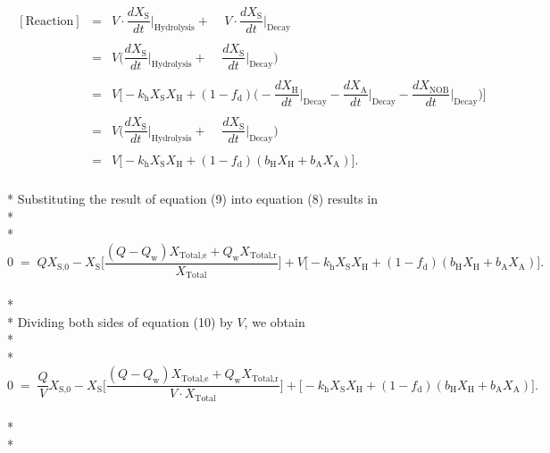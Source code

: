 \documentclass[]{article}
\begin{document}
\begin{align}
\begin{array}{rcl}
[\text{Reaction}] &=& V \cdot  \dfrac{dX_{\text{S}}}{dt}\biggr\rvert_{\text{Hydrolysis}} + \; \;  \; \; V \cdot \dfrac{dX_{\text{S}}}{dt}\biggr\rvert_{\text{Decay}} \\ \\
&=& V \Bigg(\dfrac{dX_{\text{S}}}{dt}\biggr\rvert_{\text{Hydrolysis}} + \; \;  \; \; \dfrac{dX_{\text{S}}}{dt}\biggr\rvert_{\text{Decay}}\Bigg) \\ \\
&=& V \Bigg[-k_{\text{h}}X_{\text{S}}X_{\text{H}} + (1-f_{\text{d}})\Bigg(-\dfrac{dX_{\text{H}}}{dt}\biggr\rvert_{\text{Decay}} - \dfrac{dX_{\text{A}}}{dt}\biggr\rvert_{\text{Decay}} - \dfrac{dX_{\text{NOB}}}{dt}\biggr\rvert_{\text{Decay}}\Bigg)\Bigg] \\ \\
&=& V \Bigg(\dfrac{dX_{\text{S}}}{dt}\biggr\rvert_{\text{Hydrolysis}} + \; \;  \; \; \dfrac{dX_{\text{S}}}{dt}\biggr\rvert_{\text{Decay}}\Bigg) \\ \\
&=& V \Big[-k_{\text{h}}X_{\text{S}}X_{\text{H}} + (1-f_{\text{d}})(b_{\text{H}}X_{\text{H}} + b_{\text{A}}X_{\text{A}})\Big].
\end{array}
\end{align} \\*
Substituting the result of equation (9) into equation (8) results in \\* \\* 
\begin{equation}
0 \; = \; QX_{\text{S,0}} - X_{\text{S}} \Bigg[\dfrac{(Q-Q_{\text{w}})X_{\text{Total,e}} + Q_{\text{w}}X_{\text{Total,r}}}{X_{\text{Total}}}\Bigg]  + V \Big[-k_{\text{h}}X_{\text{S}}X_{\text{H}} + (1-f_{\text{d}})(b_{\text{H}}X_{\text{H}} + b_{\text{A}}X_{\text{A}})\Big].
\end{equation} \\* \\* 
Dividing both sides of equation (10) by $V$, we obtain \\* \\* 
\begin{equation}
0 \; = \; \dfrac{Q}{V}X_{\text{S,0}} - X_{\text{S}} \Bigg[\dfrac{(Q-Q_{\text{w}})X_{\text{Total,e}} + Q_{\text{w}}X_{\text{Total,r}}}{V \cdot X_{\text{Total}}}\Bigg]  + \Big[-k_{\text{h}}X_{\text{S}}X_{\text{H}} + (1-f_{\text{d}})(b_{\text{H}}X_{\text{H}} + b_{\text{A}}X_{\text{A}})\Big].
\end{equation} \\* \\* 
\end{document}
